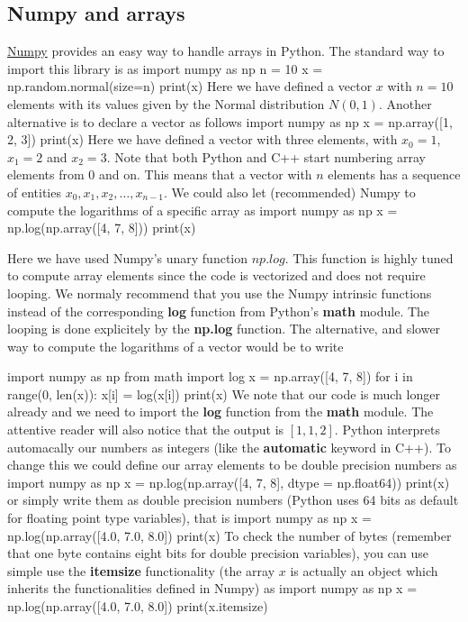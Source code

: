 \documentclass[%
oneside,                 %
final,                   %
10pt]{article}
\begin{document}
\noindent




\subsection{Numpy and arrays}
\href{{http://www.numpy.org/}}{Numpy} provides an easy way to handle arrays in Python. The standard way to import this library is as
\bpycod
import numpy as np
n = 10
x = np.random.normal(size=n)
print(x)
\epycod
Here we have defined a vector $x$ with $n=10$ elements with its values given by the Normal distribution $N(0,1)$.
Another alternative is to declare a vector as follows
\bpycod
import numpy as np
x = np.array([1, 2, 3])
print(x)
\epycod
Here we have defined a vector with three elements, with $x_0=1$, $x_1=2$ and $x_2=3$. Note that both Python and C++
start numbering array elements from $0$ and on. This means that a vector with $n$ elements has a sequence of entities $x_0, x_1, x_2, \dots, x_{n-1}$. We could also let (recommended) Numpy to compute the logarithms of a specific array as
\bpycod
import numpy as np
x = np.log(np.array([4, 7, 8]))
print(x)
\epycod

Here we have used Numpy's unary function $np.log$. This function is
highly tuned to compute array elements since the code is vectorized
and does not require looping. We normaly recommend that you use the
Numpy intrinsic functions instead of the corresponding \textbf{log} function
from Python's \textbf{math} module. The looping is done explicitely by the
\textbf{np.log} function. The alternative, and slower way to compute the
logarithms of a vector would be to write

\bpycod
import numpy as np
from math import log
x = np.array([4, 7, 8])
for i in range(0, len(x)):
    x[i] = log(x[i])
print(x)
\epycod
We note that our code is much longer already and we need to import the \textbf{log} function from the \textbf{math} module. 
The attentive reader will also notice that the output is $[1, 1, 2]$. Python interprets automacally our numbers as integers (like the \textbf{automatic} keyword in C++). To change this we could define our array elements to be double precision numbers as
\bpycod
import numpy as np
x = np.log(np.array([4, 7, 8], dtype = np.float64))
print(x)
\epycod
or simply write them as double precision numbers (Python uses 64 bits as default for floating point type variables), that is
\bpycod
import numpy as np
x = np.log(np.array([4.0, 7.0, 8.0])
print(x)
\epycod
To check the number of bytes (remember that one byte contains eight bits for double precision variables), you can use simple use the \textbf{itemsize} functionality (the array $x$ is actually an object which inherits the functionalities defined in Numpy) as 
\bpycod
import numpy as np
x = np.log(np.array([4.0, 7.0, 8.0])
print(x.itemsize)
\epycod
\end{document}

